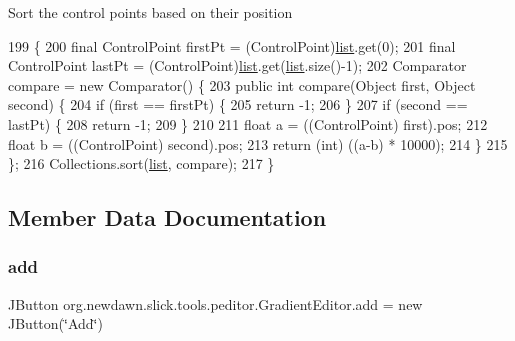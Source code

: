 Sort the control points based on their position 
\begin{DoxyCode}
199                               \{
200         \textcolor{keyword}{final} ControlPoint firstPt = (ControlPoint)\mbox{\hyperlink{classorg_1_1newdawn_1_1slick_1_1tools_1_1peditor_1_1_gradient_editor_aa53704ef8438035eb76c8c6aab8af133}{list}}.get(0);
201         \textcolor{keyword}{final} ControlPoint lastPt  = (ControlPoint)\mbox{\hyperlink{classorg_1_1newdawn_1_1slick_1_1tools_1_1peditor_1_1_gradient_editor_aa53704ef8438035eb76c8c6aab8af133}{list}}.get(\mbox{\hyperlink{classorg_1_1newdawn_1_1slick_1_1tools_1_1peditor_1_1_gradient_editor_aa53704ef8438035eb76c8c6aab8af133}{list}}.size()-1);
202         Comparator compare = \textcolor{keyword}{new} Comparator() \{
203             \textcolor{keyword}{public} \textcolor{keywordtype}{int} compare(Object first, Object second) \{
204                 \textcolor{keywordflow}{if} (first == firstPt) \{
205                     \textcolor{keywordflow}{return} -1;
206                 \}
207                 \textcolor{keywordflow}{if} (second == lastPt) \{
208                     \textcolor{keywordflow}{return} -1;
209                 \}
210                 
211                 \textcolor{keywordtype}{float} a = ((ControlPoint) first).pos;
212                 \textcolor{keywordtype}{float} b = ((ControlPoint) second).pos;
213                 \textcolor{keywordflow}{return} (\textcolor{keywordtype}{int}) ((a-b) * 10000);
214             \}
215         \};
216         Collections.sort(\mbox{\hyperlink{classorg_1_1newdawn_1_1slick_1_1tools_1_1peditor_1_1_gradient_editor_aa53704ef8438035eb76c8c6aab8af133}{list}}, compare);
217     \}
\end{DoxyCode}


\subsection{Member Data Documentation}
\mbox{\label{classorg_1_1newdawn_1_1slick_1_1tools_1_1peditor_1_1_gradient_editor_a77f7e806abe45619991ba5157e22340f}} 
\subsubsection{\texorpdfstring{add}{add}}
{\footnotesize\ttfamily J\+Button org.\+newdawn.\+slick.\+tools.\+peditor.\+Gradient\+Editor.\+add = new J\+Button(\char`\"{}Add\char`\"{})\hspace{0.3cm}{\ttfamily [private]}}


